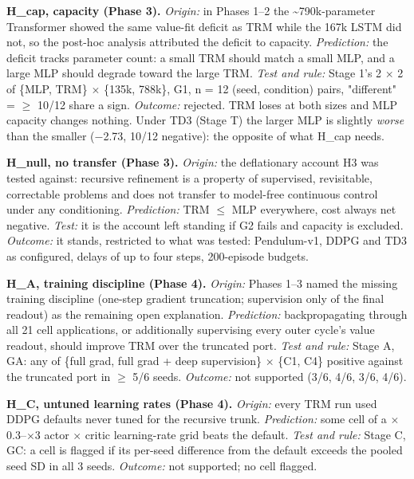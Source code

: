 \documentclass[11pt]{article}
\begin{document}
\textbf{H\_cap, capacity (Phase 3).} \emph{Origin:} in Phases 1--2 the \textasciitilde{}790k-parameter Transformer showed the same value-fit deficit as TRM while the 167k LSTM did not, so the post-hoc analysis attributed the deficit to capacity. \emph{Prediction:} the deficit tracks parameter count: a small TRM should match a small MLP, and a large MLP should degrade toward the large TRM. \emph{Test and rule:} Stage 1's 2 $\times$ 2 of \{MLP, TRM\} $\times$ \{135k, 788k\}, G1, n = 12 (seed, condition) pairs, "different" = $\geq$ 10/12 share a sign. \emph{Outcome:} rejected. TRM loses at both sizes and MLP capacity changes nothing. Under TD3 (Stage T) the larger MLP is slightly \emph{worse} than the smaller ($-$2.73, 10/12 negative): the opposite of what H\_cap needs.



\textbf{H\_null, no transfer (Phase 3).} \emph{Origin:} the deflationary account H3 was tested against: recursive refinement is a property of supervised, revisitable, correctable problems and does not transfer to model-free continuous control under any conditioning. \emph{Prediction:} TRM $\leq$ MLP everywhere, cost always net negative. \emph{Test:} it is the account left standing if G2 fails and capacity is excluded. \emph{Outcome:} it stands, restricted to what was tested: Pendulum-v1, DDPG and TD3 as configured, delays of up to four steps, 200-episode budgets.



\textbf{H\_A, training discipline (Phase 4).} \emph{Origin:} Phases 1--3 named the missing training discipline (one-step gradient truncation; supervision only of the final readout) as the remaining open explanation. \emph{Prediction:} backpropagating through all 21 cell applications, or additionally supervising every outer cycle's value readout, should improve TRM over the truncated port. \emph{Test and rule:} Stage A, GA: any of \{full grad, full grad + deep supervision\} $\times$ \{C1, C4\} positive against the truncated port in $\geq$ 5/6 seeds. \emph{Outcome:} not supported (3/6, 4/6, 3/6, 4/6).



\textbf{H\_C, untuned learning rates (Phase 4).} \emph{Origin:} every TRM run used DDPG defaults never tuned for the recursive trunk. \emph{Prediction:} some cell of a $\times$0.3--$\times$3 actor $\times$ critic learning-rate grid beats the default. \emph{Test and rule:} Stage C, GC: a cell is flagged if its per-seed difference from the default exceeds the pooled seed SD in all 3 seeds. \emph{Outcome:} not supported; no cell flagged.
\end{document}
